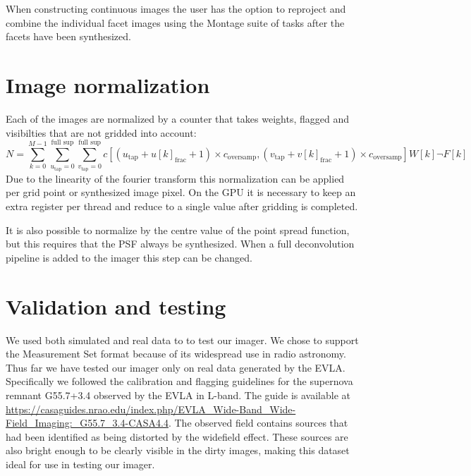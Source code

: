 When constructing continuous images the user has the option to reproject and combine the individual facet images using the Montage \cite{jacob2004montage} suite of tasks after the facets have been
synthesized.

\section{Image normalization}
Each of the images are normalized by a counter that takes weights, flagged and visibilties that are not gridded into account:
\begin{equation}
 N = \sum_{k=0}^{M-1}{\sum_{u_\text{tap}=0}^{\text{full sup}}{\sum_{v_\text{tap}=0}^{\text{full sup}}{c[(u_\text{tap}+u[k]_\text{frac} + 1)\times c_\text{oversamp},(v_\text{tap}+v[k]_\text{frac} + 1)\times c_\text{oversamp}]}} W[k]\neg F[k]}
\end{equation}
Due to the linearity of the fourier transform this normalization can be applied per grid point or synthesized image pixel. On the GPU it is necessary to keep an extra register per thread and reduce
to a single value after gridding is completed.

It is also possible to normalize by the centre value of the point spread function, but this requires that the PSF always be synthesized. When a full deconvolution pipeline is added to the imager this step
can be changed.

\section{Validation and testing}
We used both simulated and real data to to test our imager. We chose to support the Measurement Set format because of its widespread use in radio astronomy. Thus far we have tested our imager only on real data generated
by the EVLA. Specifically we followed the calibration and flagging guidelines for the supernova remnant G55.7+3.4 observed by the EVLA in L-band. The guide is available at \url{https://casaguides.nrao.edu/index.php/EVLA_Wide-Band_Wide-Field_Imaging:_G55.7_3.4-CASA4.4}.
The observed field contains sources that had been identified as being distorted by the widefield effect. These sources are also bright enough to be clearly visible in the dirty images, making this dataset ideal for use in
testing our imager.

